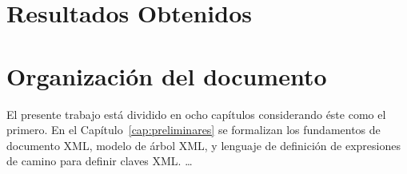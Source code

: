 \section{Resultados Obtenidos}
\label{intro:resultados}


\section{Organizaci\'on del documento}
\label{intro:organizacion}

El presente trabajo está dividido en ocho capítulos considerando éste como el primero. En el Capítulo~\ref{cap:preliminares} se formalizan los fundamentos de documento XML, modelo de árbol XML, y lenguaje de definición de expresiones de camino para definir claves XML. \ldots

